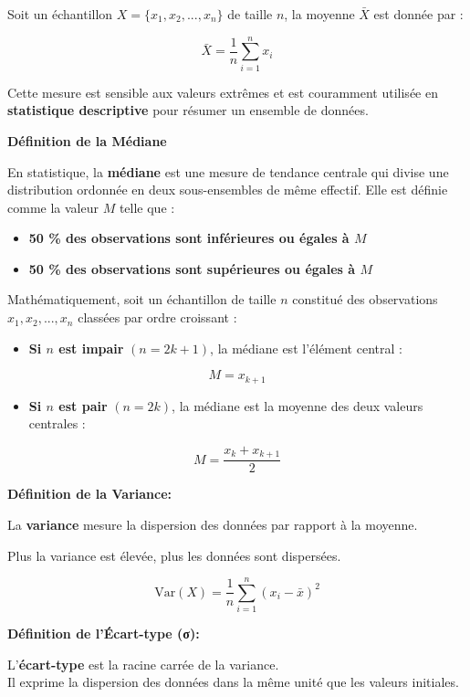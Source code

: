 \documentclass[
]{article}
\providecommand{\tightlist}{%
  \setlength{\itemsep}{0pt}\setlength{\parskip}{0pt}}
\begin{document}
Soit un échantillon \(X = \{x_1, x_2, ..., x_n\}\) de taille \(n\), la
moyenne \(\bar{X}\) est donnée par :

\[
\bar{X} = \frac{1}{n} \sum_{i=1}^{n} x_i
\]

Cette mesure est sensible aux valeurs extrêmes et est couramment
utilisée en \textbf{statistique descriptive} pour résumer un ensemble de
données.

\textbf{Définition de la Médiane}

En statistique, la \textbf{médiane} est une mesure de tendance centrale
qui divise une distribution ordonnée en deux sous-ensembles de même
effectif. Elle est définie comme la valeur \(M\) telle que :

\begin{itemize}
\tightlist
\item
  \textbf{50 \% des observations sont inférieures ou égales à \(M\)}\\
\item
  \textbf{50 \% des observations sont supérieures ou égales à \(M\)}
\end{itemize}

Mathématiquement, soit un échantillon de taille \(n\) constitué des
observations \textbf{\(x_1, x_2, ..., x_n\)} classées par ordre
croissant :

\begin{itemize}
\tightlist
\item
  \textbf{Si \(n\) est impair} \((n = 2k + 1)\), la médiane est
  l'élément central :
\end{itemize}

\[
M = x_{k+1}
\]

\begin{itemize}
\tightlist
\item
  \textbf{Si \(n\) est pair} \((n = 2k)\), la médiane est la moyenne des
  deux valeurs centrales :
\end{itemize}

\[
M = \frac{x_k + x_{k+1}}{2}
\]

\textbf{Définition de la Variance:}

La \textbf{variance} mesure la dispersion des données par rapport à la
moyenne.

Plus la variance est élevée, plus les données sont dispersées.

\[
\text{Var}(X) = \frac{1}{n} \sum_{i=1}^{n}(x_i - \bar{x})^2
\]

\textbf{Définition de l'Écart-type (σ):}

L'\textbf{écart-type} est la racine carrée de la variance.\\
Il exprime la dispersion des données dans la même unité que les valeurs
initiales.
\end{document}
